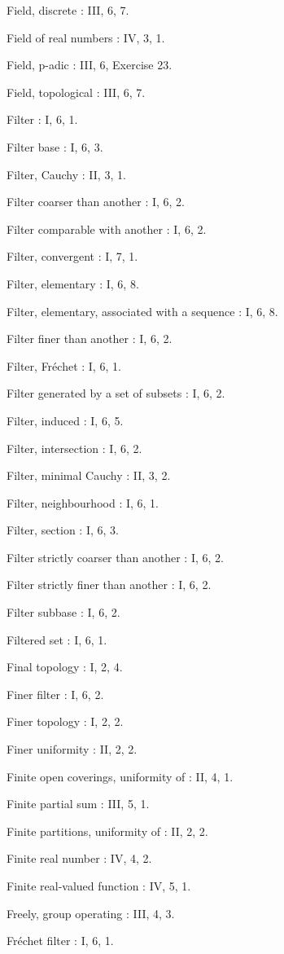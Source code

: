 Field, discrete : III, 6, 7.

Field of real numbers : IV, 3, 1.

Field, p-adic : III, 6, Exercise 23.

Field, topological : III, 6, 7.

Filter : I, 6, 1.

Filter base : I, 6, 3.

Filter, Cauchy : II, 3, 1.

Filter coarser than another : I, 6, 2.

Filter comparable with another : I, 6, 2.

Filter, convergent : I, 7, 1.

Filter, elementary : I, 6, 8.

Filter, elementary, associated with a sequence : I, 6, 8.

Filter finer than another : I, 6, 2.

Filter, Fréchet : I, 6, 1.

Filter generated by a set of subsets : I, 6, 2.

Filter, induced : I, 6, 5.

Filter, intersection : I, 6, 2.

Filter, minimal Cauchy : II, 3, 2.

Filter, neighbourhood : I, 6, 1.

Filter, section : I, 6, 3.

Filter strictly coarser than another : I, 6, 2.

Filter strictly finer than another : I, 6, 2.

Filter subbase : I, 6, 2.

Filtered set : I, 6, 1.

Final topology : I, 2, 4.

Finer filter : I, 6, 2.

Finer topology : I, 2, 2.

Finer uniformity : II, 2, 2.

Finite open coverings, uniformity of : II, 4, 1.

Finite partial sum : III, 5, 1.

Finite partitions, uniformity of : II, 2, 2.

Finite real number : IV, 4, 2.

Finite real-valued function : IV, 5, 1.

Freely, group operating : III, 4, 3.

Fréchet filter : I, 6, 1.

